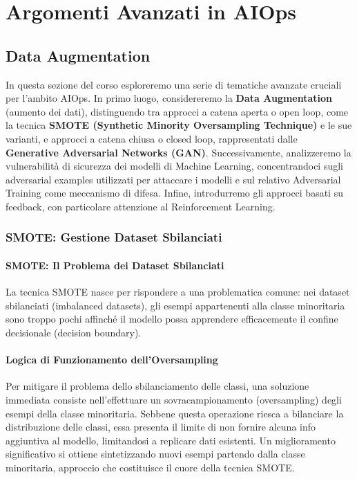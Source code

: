 ﻿\section{Argomenti Avanzati in AIOps}

\subsection{Data Augmentation}

In questa sezione del corso esploreremo una serie di tematiche
avanzate cruciali per l'ambito AIOps. In primo luogo,
considereremo la \textbf{Data Augmentation} (aumento dei dati),
distinguendo tra approcci a catena aperta o open loop, come la
tecnica \textbf{SMOTE (Synthetic Minority Oversampling Technique)}
e le sue varianti, e approcci a catena chiusa o closed loop,
rappresentati dalle \textbf{Generative Adversarial Networks
(GAN)}. Successivamente, analizzeremo la vulnerabilità di
sicurezza dei modelli di Machine Learning, concentrandoci sugli
adversarial examples utilizzati per attaccare i modelli e sul
relativo Adversarial Training come meccanismo di difesa. Infine,
introdurremo gli approcci basati su feedback, con particolare
attenzione al Reinforcement Learning.

\subsubsection{SMOTE: Gestione Dataset Sbilanciati}

\paragraph{SMOTE: Il Problema dei Dataset Sbilanciati}

La tecnica SMOTE nasce per rispondere a una problematica comune:
nei dataset sbilanciati (imbalanced datasets), gli esempi
appartenenti alla classe minoritaria sono troppo pochi affinché
il modello possa apprendere efficacemente il confine decisionale
(decision boundary).

\paragraph{Logica di Funzionamento dell'Oversampling}

Per mitigare il problema dello sbilanciamento delle classi, una
soluzione immediata consiste nell'effettuare un sovracampionamento
(oversampling) degli esempi della classe minoritaria. Sebbene
questa operazione riesca a bilanciare la distribuzione delle
classi, essa presenta il limite di non fornire alcuna info
aggiuntiva al modello, limitandosi a replicare dati esistenti.
Un miglioramento significativo si ottiene sintetizzando nuovi
esempi partendo dalla classe minoritaria, approccio che
costituisce il cuore della tecnica SMOTE.

